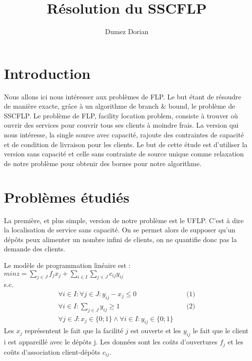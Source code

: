 \documentclass[12pt,a4paper]{article}
\begin{document}
\title{Résolution du SSCFLP}

\author{Dumez Dorian}

\maketitle

\section*{Introduction}

Nous allons ici nous intéresser aux problèmes de FLP. Le but étant de résoudre de manière exacte, grâce à un algorithme de branch \& bound, le problème de SSCFLP. Le problème de FLP, facility location problem, consiste à trouver où ouvrir des services pour couvrir tous ses clients à moindre frais. La version qui nous intéresse, la single source avec capacité, rajoute des contraintes de capacité et de condition de livraison pour les clients. Le but de cette étude est d'utiliser la version sans capacité et celle sans contrainte de source unique comme relaxation de notre problème pour obtenir des bornes pour notre algorithme. 

\section{Problèmes étudiés}

La première, et plus simple, version de notre problème est le UFLP. C'est à dire la localisation de service sans capacité. On se permet alors de supposer qu'un dépôts peux alimenter un nombre infini de clients, on ne quantifie donc pas la demande des clients.

Le modèle de programmation linéaire est :\\
$min z = \sum \limits_{j \in J} f_j x_j + \sum \limits_{i \in I} \sum \limits_{j \in J} c_{ij} y_{ij}$\\
s.c.
\begin{align*}
 \forall i \in I : \forall j \in J : y_{ij} - x_j \leqslant 0 & & \text{ (1)} \\
 \forall i \in I : \sum \limits_{j \in J} y_{ij} \geqslant 1 & & \text{ (2)} \\
 \forall j \in J : x_j \in \{0;1\} \land \forall i \in I  : y_{ij} \in \{0;1\} 
\end{align*}
Les $x_j$ représentent le fait que la facilité $j$ est ouverte et les $y_{ij}$ le fait que le client i est appareillé avec le dépôts j. Les données sont les coûts d'ouvertures $f_j$ et les coûts d'association client-dépôts $c_{ij}$.
\end{document}
